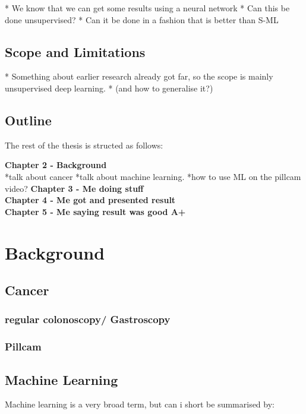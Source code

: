 \documentclass[a4paper,english]{ifimaster}
\begin{document}
		* We know that we can get some results using a neural network
		* Can this be done unsupervised?
		* Can it be done in a fashion that is better than S-ML
		 
		
		
	\section{Scope and Limitations}
		* Something about earlier research already got far, so the scope is mainly unsupervised deep learning.
		* (and how to generalise it?)
		
	
		

	\section{Outline}
	The rest of the thesis is structed as follows:
	
	\textbf{Chapter 2 - Background}\\
	*talk about cancer
	*talk about machine learning.
	*how to use ML on the pillcam video?
	\textbf{Chapter 3 - Me doing stuff}\\
	\textbf{Chapter 4 - Me got and presented result}\\
	\textbf{Chapter 5 - Me saying result was good A+}\\
	
		
\chapter{Background}
	\section{Cancer}
	  \subsection{regular colonoscopy/ Gastroscopy}
	  \subsection{Pillcam}
	  
	  
	\section{Machine Learning}
	Machine learning is a very broad term, but can i short be summarised by:\\
	\vspace{10px}
	
\end{document}

